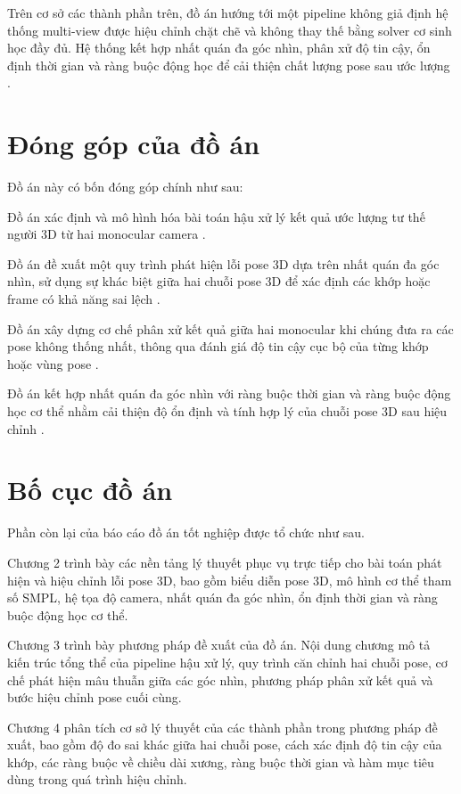\documentclass[../DoAn.tex]{subfiles}
\begin{document}
Trên cơ sở các thành phần trên, đồ án hướng tới một pipeline không giả định hệ thống multi-view được hiệu chỉnh chặt chẽ và không thay thế bằng solver cơ sinh học đầy đủ. Hệ thống kết hợp nhất quán đa góc nhìn, phân xử độ tin cậy, ổn định thời gian và ràng buộc động học để cải thiện chất lượng pose sau ước lượng \cite{vu2026multiperspective}.

\section{Đóng góp của đồ án}
\label{sec:donggop}

Đồ án này có bốn đóng góp chính như sau:

Đồ án xác định và mô hình hóa bài toán hậu xử lý kết quả ước lượng tư thế người 3D từ hai monocular camera \cite{vu2026multiperspective}.

Đồ án đề xuất một quy trình phát hiện lỗi pose 3D dựa trên nhất quán đa góc nhìn, sử dụng sự khác biệt giữa hai chuỗi pose 3D để xác định các khớp hoặc frame có khả năng sai lệch \cite{vu2026multiperspective}.

Đồ án xây dựng cơ chế phân xử kết quả giữa hai monocular khi chúng đưa ra các pose không thống nhất, thông qua đánh giá độ tin cậy cục bộ của từng khớp hoặc vùng pose \cite{vu2026multiperspective}.

Đồ án kết hợp nhất quán đa góc nhìn với ràng buộc thời gian và ràng buộc động học cơ thể nhằm cải thiện độ ổn định và tính hợp lý của chuỗi pose 3D sau hiệu chỉnh \cite{keller2023skin,delp2007opensim,vu2026multiperspective}.

\section{Bố cục đồ án}
\label{sec:bocuc}

Phần còn lại của báo cáo đồ án tốt nghiệp được tổ chức như sau.

Chương 2 trình bày các nền tảng lý thuyết phục vụ trực tiếp cho bài toán phát hiện và hiệu chỉnh lỗi pose 3D, bao gồm biểu diễn pose 3D, mô hình cơ thể tham số SMPL, hệ tọa độ camera, nhất quán đa góc nhìn, ổn định thời gian và ràng buộc động học cơ thể.

Chương 3 trình bày phương pháp đề xuất của đồ án. Nội dung chương mô tả kiến trúc tổng thể của pipeline hậu xử lý, quy trình căn chỉnh hai chuỗi pose, cơ chế phát hiện mâu thuẫn giữa các góc nhìn, phương pháp phân xử kết quả và bước hiệu chỉnh pose cuối cùng.

Chương 4 phân tích cơ sở lý thuyết của các thành phần trong phương pháp đề xuất, bao gồm độ đo sai khác giữa hai chuỗi pose, cách xác định độ tin cậy của khớp, các ràng buộc về chiều dài xương, ràng buộc thời gian và hàm mục tiêu dùng trong quá trình hiệu chỉnh.
\end{document}
